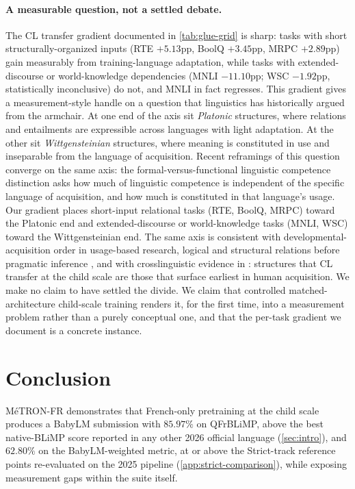\documentclass[11pt]{article}
\begin{document}
\paragraph{A measurable question, not a settled debate.} The CL transfer gradient documented in \autoref{tab:glue-grid} is sharp: tasks with short structurally-organized inputs (RTE $+5.13$pp, BoolQ $+3.45$pp, MRPC $+2.89$pp) gain measurably from training-language adaptation, while tasks with extended-discourse or world-knowledge dependencies (MNLI $-11.10$pp; WSC $-1.92$pp, statistically inconclusive) do not, and MNLI in fact regresses. This gradient gives a measurement-style handle on a question that linguistics has historically argued from the armchair. At one end of the axis sit \emph{Platonic} structures, where relations and entailments are expressible across languages with light adaptation. At the other sit \emph{Wittgensteinian} structures, where meaning is constituted in use and inseparable from the language of acquisition. Recent reframings of this question converge on the same axis: the formal-versus-functional linguistic competence distinction \citep{mahowald2024dissociating} asks how much of linguistic competence is independent of the specific language of acquisition, and how much is constituted in that language's usage. Our gradient places short-input relational tasks (RTE, BoolQ, MRPC) toward the Platonic end and extended-discourse or world-knowledge tasks (MNLI, WSC) toward the Wittgensteinian end. The same axis is consistent with developmental-acquisition order in usage-based research, logical and structural relations before pragmatic inference \citep{tomasello2003constructing}, and with crosslinguistic evidence in \citet{slobin1985crosslinguistic}: structures that CL transfer at the child scale are those that surface earliest in human acquisition. We make no claim to have settled the divide. We claim that controlled matched-architecture child-scale training renders it, for the first time, into a measurement problem rather than a purely conceptual one, and that the per-task gradient we document is a concrete instance.

\section{Conclusion}
\label{sec:conclusion}

MéTRON-FR demonstrates that French-only pretraining at the child scale produces a BabyLM submission with $85.97\%$ on QFrBLiMP, above the best native-BLiMP score reported in any other 2026 official language (\autoref{sec:intro}), and $62.80\%$ on the BabyLM-weighted metric, at or above the Strict-track reference points re-evaluated on the 2025 pipeline (\autoref{app:strict-comparison}), while exposing measurement gaps within the suite itself.
\end{document}

